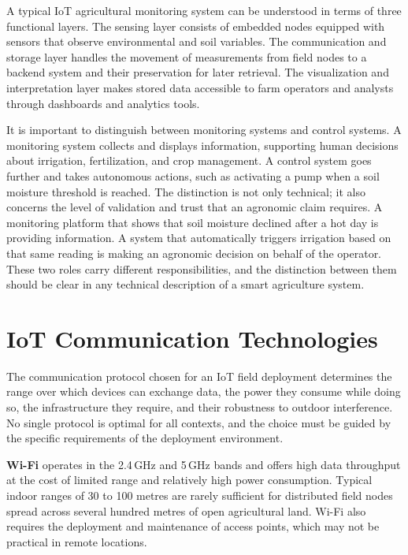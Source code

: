 A typical IoT agricultural monitoring system can be understood in terms of three
functional layers. The sensing layer consists of embedded nodes equipped with
sensors that observe environmental and soil variables. The communication and
storage layer handles the movement of measurements from field nodes to a backend
system and their preservation for later retrieval. The visualization and
interpretation layer makes stored data accessible to farm operators and analysts
through dashboards and analytics tools.

It is important to distinguish between monitoring systems and control systems.
A monitoring system collects and displays information, supporting human decisions
about irrigation, fertilization, and crop management. A control system goes
further and takes autonomous actions, such as activating a pump when a soil
moisture threshold is reached. The distinction is not only technical; it also
concerns the level of validation and trust that an agronomic claim requires.
A monitoring platform that shows that soil moisture declined after a hot day is
providing information. A system that automatically triggers irrigation based on
that same reading is making an agronomic decision on behalf of the operator.
These two roles carry different responsibilities, and the distinction between
them should be clear in any technical description of a smart agriculture system.

\section{IoT Communication Technologies}
\label{sec:communication}

The communication protocol chosen for an IoT field deployment determines the
range over which devices can exchange data, the power they consume while doing so,
the infrastructure they require, and their robustness to outdoor interference.
No single protocol is optimal for all contexts, and the choice must be guided by
the specific requirements of the deployment environment.

\textbf{Wi-Fi} operates in the 2.4\,GHz and 5\,GHz bands and offers high data
throughput at the cost of limited range and relatively high power consumption.
Typical indoor ranges of 30 to 100 metres are rarely sufficient for distributed
field nodes spread across several hundred metres of open agricultural land. Wi-Fi
also requires the deployment and maintenance of access points, which may not be
practical in remote locations.

